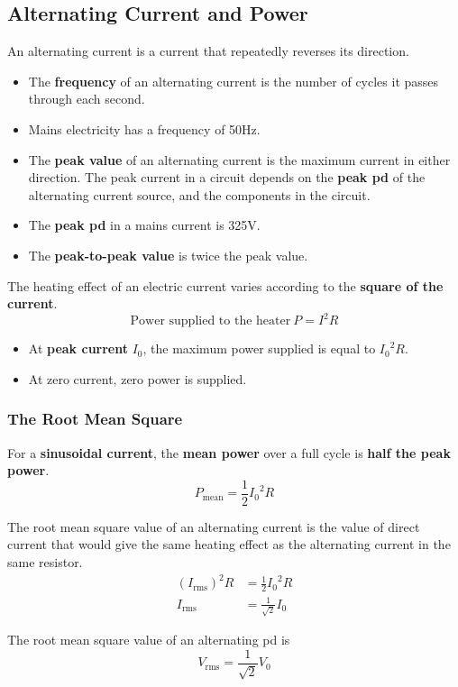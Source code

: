 \subsection{Alternating Current and Power}

An alternating current is a current that repeatedly reverses its direction.
\begin{itemize}
    \item The \textbf{frequency} of an alternating current is the number of cycles it passes through each second.
    \item Mains electricity has a frequency of 50Hz.
    \item The \textbf{peak value} of an alternating current is the maximum current in either direction. The peak current in a circuit depends on the \textbf{peak pd} of the alternating current source, and the components in the circuit.
    \item The \textbf{peak pd} in a mains current is 325V.
    \item The \textbf{peak-to-peak value} is twice the peak value.
\end{itemize}

The heating effect of an electric current varies according to the \textbf{square of the current}.
$$\text{Power supplied to the heater}\ P=I^2R$$
\begin{itemize}
    \item At \textbf{peak current} $I_0$, the maximum power supplied is equal to ${I_0}^2R$.
    \item At zero current, zero power is supplied.
\end{itemize}

\subsubsection*{The Root Mean Square}


For a \textbf{sinusoidal current}, the \textbf{mean power} over a full cycle is \textbf{half the peak power}.
$$P_\text{mean}=\frac{1}{2}{I_0}^2R$$

The root mean square value of an alternating current is the value of direct current that would give the same heating effect as the alternating current in the same resistor.
\begin{align*}
    (I_\text{rms})^2R&=\frac{1}{2}{I_0}^2R\\
    I_\text{rms}&=\frac{1}{\sqrt{2}}I_0
\end{align*}

The root mean square value of an alternating pd is
$$V_\text{rms}=\frac{1}{\sqrt{2}}V_0$$
